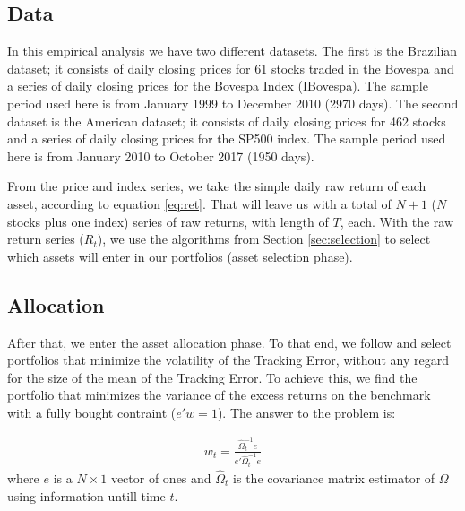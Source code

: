 \documentclass[12pt,oneside,a4paper]{memoir}
\begin{document}
\subsection{Data} \label{sec:data}

In this empirical analysis we have two different datasets.
The first is the Brazilian dataset; it consists of daily closing prices for 61 stocks traded in the Bovespa and a series of daily closing prices for the Bovespa Index (IBovespa).
The sample period used here is from January 1999 to December 2010 (2970 days).
The second dataset is the American dataset; it consists of daily closing prices for 462 stocks and a series of daily closing prices for the SP500 index.
The sample period used here is from January 2010 to October 2017 (1950 days).

From the price and index series, we take the simple daily raw return of each asset, according to equation \eqref{eq:ret}.
That will leave us with a total of $N+1$ ($N$ stocks plus one index) series of raw returns, with length of $T$, each.
With the raw return series ($R_{t}$), we use the algorithms from Section \ref{sec:selection} to select which assets will enter in our portfolios (asset selection phase).

\subsection*{Allocation}
After that, we enter the asset allocation phase.
To that end, we follow  and select portfolios that minimize the volatility of the Tracking Error, without any regard for the size of the mean of the Tracking Error.
To achieve this, we find the portfolio that minimizes the variance of the excess returns on the benchmark with a fully bought contraint ($e'w=1$).
The answer to the problem is:

\begin{align} \label{eq:gmv}
w_{t} = \frac{\hat{\Omega}_{t}^{-1}e}{e'\hat{\Omega}_{t}^{-1}e}
\end{align}
where $e$ is a $N \times 1$ vector of ones and $\hat{\Omega}_{t}$ is the covariance matrix estimator of $\Omega$ using information untill time $t$.
\end{document}
